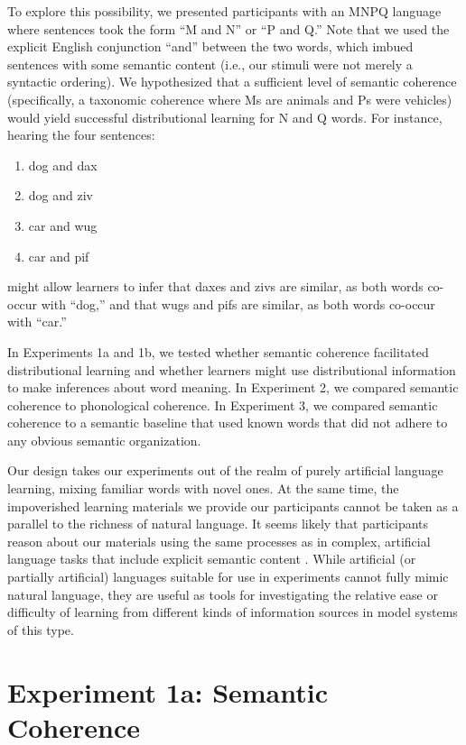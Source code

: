 \documentclass[man,longtable, floatmark]{my-apa6}
\begin{document}
To explore this possibility, we presented participants with an MNPQ language where sentences took the form ``M and N'' or ``P and Q.'' Note that we used the explicit English conjunction ``and'' between the two words, which imbued sentences with some semantic content (i.e., our stimuli were not merely a syntactic ordering). We hypothesized that a sufficient level of semantic coherence (specifically, a taxonomic coherence where Ms are animals and Ps were vehicles) would yield successful distributional learning for N and Q words. For instance, hearing the four sentences:

\begin{enumerate}
\item dog and dax
\item dog and ziv
\item car and wug
\item car and pif
\end{enumerate}

\noindent might allow learners to infer that daxes and zivs are similar, as both words co-occur with ``dog,'' and that wugs and pifs are similar, as both words co-occur with ``car.''

In Experiments 1a and 1b, we tested whether semantic coherence facilitated distributional learning and whether learners might use distributional information to make inferences about word meaning. In Experiment 2, we compared semantic coherence to phonological coherence. In Experiment 3, we compared semantic coherence to a semantic baseline that used known words that did not adhere to any obvious semantic organization.

Our design takes our experiments out of the realm of purely artificial language learning, mixing familiar words with novel ones.
At the same time, the impoverished learning materials we provide our participants cannot be taken as a parallel to the richness of natural language.
It seems likely that participants reason about our materials using the same processes as in complex, artificial language tasks that include explicit semantic content \citep{braine1987}.
While artificial (or partially artificial) languages suitable for use in experiments cannot fully mimic natural language, they are useful as tools for investigating the relative ease or difficulty of learning from different kinds of information sources in model systems of this type.


\section{Experiment 1a: Semantic Coherence}
\end{document}
